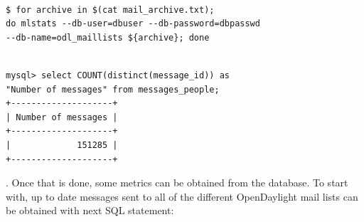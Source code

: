 \documentclass[a4paper, 12pt]{book}
\begin{document}
\begin{verbatim}

$ for archive in $(cat mail_archive.txt);
do mlstats --db-user=dbuser --db-password=dbpasswd
--db-name=odl_maillists ${archive}; done

\end{verbatim}


\begin{verbatim}

mysql> select COUNT(distinct(message_id)) as
"Number of messages" from messages_people;
+--------------------+
| Number of messages |
+--------------------+
|             151285 |
+--------------------+

\end{verbatim}
. Once that is done, some metrics can be obtained from the database. To start with, up to date messages sent to all of the different OpenDaylight mail lists can be obtained with next SQL statement:
\end{document}
